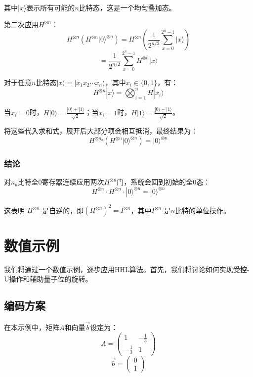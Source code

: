 \documentclass{article}
\begin{document}
其中$|x\rangle$表示所有可能的$n$比特态，这是一个均匀叠加态。

第二次应用$H^{\otimes n}$：
\[
H^{\otimes n}\left(H^{\otimes n}|0\rangle^{\otimes n}\right) = H^{\otimes n}\left(\frac{1}{2^{n/2}} \sum_{x=0}^{2^{n}-1} |x\rangle\right)
\]
\[
= \frac{1}{2^{n/2}} \sum_{x=0}^{2^{n}-1} H^{\otimes n}|x\rangle
\]

对于任意$n$比特态$|x\rangle = |x_1x_2\cdots x_n\rangle$，其中$x_i \in \{0,1\}$，有：
\[
H^{\otimes n}|x\rangle = \bigotimes_{i=1}^{n} H|x_i\rangle
\]

当$x_i = 0$时，$H|0\rangle = \frac{|0\rangle + |1\rangle}{\sqrt{2}}$；当$x_i = 1$时，$H|1\rangle = \frac{|0\rangle - |1\rangle}{\sqrt{2}}$。

将这些代入求和式，展开后大部分项会相互抵消，最终结果为：
\[
H^{\otimes n_b}\left(H^{\otimes n}|0\rangle^{\otimes n}\right) = |0\rangle^{\otimes n}
\]

\subsubsection{结论}

对$n_b$比特全0寄存器连续应用两次$H^{\otimes n}$门，系统会回到初始的全0态：
\[
H^{\otimes n} \cdot H^{\otimes n} \cdot |0\rangle^{\otimes n} = |0\rangle^{\otimes n}
\]

这表明 \(H^{\otimes n}\) 是自逆的，即${{\left( H^{\otimes n} \right)}^2} = I^{\otimes n}$，其中\(I^{\otimes n}\) 是$n$比特的单位操作。





\section{数值示例}

我们将通过一个数值示例，逐步应用HHL算法。首先，我们将讨论如何实现受控-U操作和辅助量子位的旋转。

\subsection{编码方案}

在本示例中，矩阵\(A\)和向量\(\vec{b}\)设定为：
\[
A = \begin{pmatrix} 1 & -\frac{1}{3} \\ -\frac{1}{3} & 1 \end{pmatrix}
\]
\[
\vec{b} = \begin{pmatrix} 0 \\ 1 \end{pmatrix}
\]
\end{document}
